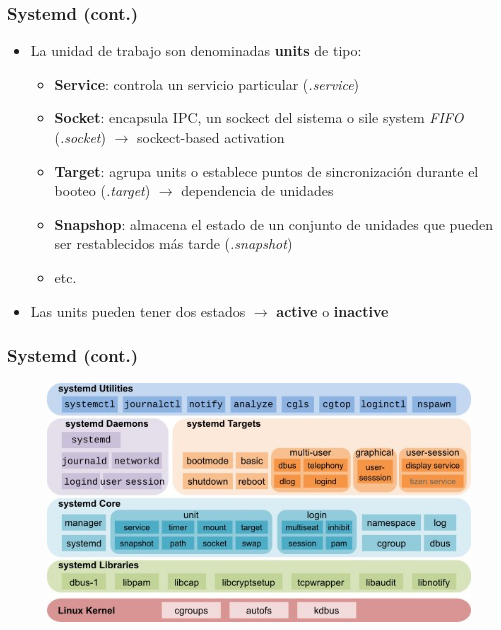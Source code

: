 \begin{frame}
  	\frametitle{\textbf{Systemd} (cont.)}
  	\begin{itemize}
		\item La unidad de trabajo son denominadas \textbf{units} de tipo:
		\begin{itemize}
			\item \textbf{Service}: controla un servicio particular (\emph{.service})
			\item \textbf{Socket}: encapsula IPC, un sockect del sistema o sile system \emph{FIFO} (\emph{.socket}) $\rightarrow$ sockect-based activation
			\item \textbf{Target}: agrupa units o establece puntos de sincronización durante el booteo (\emph{.target}) $\rightarrow$ dependencia de unidades
			\item \textbf{Snapshop}: almacena el estado de un conjunto de unidades que pueden ser restablecidos más tarde (\emph{.snapshot})
			\item etc.
		\end{itemize}
		\item Las units pueden tener dos estados $\rightarrow$ \textbf{active} o \textbf{inactive}
  	\end{itemize}
\end{frame}

\begin{frame}
  \frametitle{\textbf{Systemd} (cont.)}
  \begin{figure}
	    \includegraphics[scale=0.5]{images/systemd.jpg}
  \end{figure}
\end{frame}

